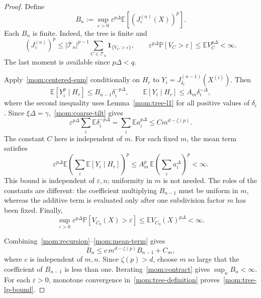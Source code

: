 \documentclass[11pt,letterpaper]{article}
\newcommand{\E}{\mathbb E}
\renewcommand{\P}{\mathbb P}
\newcommand{\ind}{\mathbf 1}
\newcommand{\eps}{\varepsilon}
\theoremstyle{definition}
\theoremstyle{remark}
\numberwithin{equation}{section}
\begin{document}
\begin{proof}
Define
\begin{equation*}
 B_n:=\sup_{\eps>0}
       \eps^{p\Delta}\E[(J_\eps^{(n)}(X))^p].
\end{equation*}
Each $B_n$ is finite.  Indeed, the tree is finite and
\begin{equation*}
 (J_\eps^{(n)})^p
 \le|\mathcal T_n|^{p-1}
       \sum_{C\in\mathcal T_n}\ind_{\{V_C>\eps\}},
 \qquad
 \eps^{p\Delta}\P[V_C>\eps]\le\E V_C^{p\Delta}<\infty.
\end{equation*}
The last moment is available since $p\Delta<q$.

Apply~\eqref{mom:centered-sum} conditionally on $H_r$ to $Y_i=J_{\delta_i}^{(n-1)}(X^{(i)})$.  Then
\begin{equation*}
 \E[Y_i^p\mid H_r]\le B_{n-1}\delta_i^{-p\Delta},
 \qquad
 \E[Y_i\mid H_r]\le A_m\delta_i^{-\Delta},
\end{equation*}
where the second inequality uses Lemma~\ref{mom:tree-l1} for all positive values of $\delta_i$. Since $\xi\Delta=\gamma$,~\eqref{mom:coarse-tilt} gives
\begin{equation}\label{mom:diagonal}
 \eps^{p\Delta}\sum_i\E\delta_i^{-p\Delta}
 =\sum_i\E a_i^{p\Delta}
 \le C m^{d-\zeta(p)}.
\end{equation}
The constant $C$ here is independent of $m$. For each fixed $m$, the mean term satisfies
\begin{equation}\label{mom:mean-term}
 \eps^{p\Delta}
  \E\left(\sum_i\E[Y_i\mid H_r]\right)^p
 \le A_m^p\,\E\left(\sum_i a_i^\Delta\right)^p
 <\infty.
\end{equation}
This bound is independent of $\eps,n$; uniformity in $m$ is not needed. The roles of the constants are different: the coefficient multiplying $B_{n-1}$ must be uniform in $m$, whereas the additive term is evaluated only after one subdivision factor $m$ has been fixed.  Finally,
\begin{equation*}
 \sup_{\eps>0}
   \eps^{p\Delta}\P[V_{C_0}(X)>\eps]
 \le\E V_{C_0}(X)^{p\Delta}<\infty.
\end{equation*}

Combining~\eqref{mom:recursion}--\eqref{mom:mean-term} gives
\begin{equation}\label{mom:contract}
 B_n\le c\,m^{d-\zeta(p)}B_{n-1}+C_m,
\end{equation}
where $c$ is independent of $m,n$. Since $\zeta(p)>d$, choose $m$ so large that the coefficient of $B_{n-1}$ is less than one.  Iterating~\eqref{mom:contract} gives $\sup_n B_n<\infty$. For each $\eps>0$, monotone convergence in~\eqref{mom:tree-definition} proves~\eqref{mom:tree-lp-bound}.
\end{proof}
\end{document}
